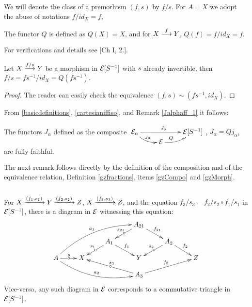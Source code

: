 \begin{definitionst}
We will denote the class of a premorhism  $(f,s)$ by  ${f/s}$. For $A = X$ we adopt the abuse of notations $f/{id_X} = f$, 

\vspace{1ex}

The functor $Q$ is defined as $Q(X) = X$, and for $X \overset {f} {\longrightarrow} Y$,  
$Q(f) = f/{id_X} = f$.  

\vspace{1ex}

For verifications and details see \cite{gabzis}[Ch I, 2.].

\end{definitionst}

\begin{remark} \label{Jalphaff_1}
Let  $X \overset {f/s} {\longrightarrow} Y$ be a morphism in $\mathcal{E}[S^{-1}]$ with $s$ already invertible, then 
$f/s = fs^{-1}/id_X = Q(fs^{-1})$.
\end{remark}\begin{proof}
The reader can easily check the equivalence $(f,s) \sim (fs^{-1}, id_X)$.
\end{proof}
%
From \ref{basicdefinitions}, \ref{cartesianiffiso}, and Remark 
\ref{Jalphaff_1} it follows:
\begin{remark} \label{Jalphafandf}
The functors $J_\alpha$  defined as the composite
$
\xymatrix@R=0ex
     {
      \cc{E}_\alpha  \ar@/_0.5pc/[dr]^{j_\alpha} 
                     \ar[rr]^{J_\alpha} 
   && \cc{E}[S^{-1}]
  \\ 
    & \cc{E} \ar@/_0.5pc/[ur]^<(0.21)Q %
     }		
$, \mbox{$J_\alpha = Qj_\alpha$}, are fully-faithful. \cqd
\end{remark}
The next remark follows directly by the definition of the composition and of the equivalence relation, Definition 
\ref{gzfractions}, items \ref{gzCompo} and \ref{gzMorph}. 
\begin{remark} \label{lift_triangles} ${ }$

For $X \xrightarrow{(f_1,s_1)} Y \xrightarrow{(f_2,s_2)} Z$, 
$X \xrightarrow{(f_3,s_3)} Z$, 
and the equation $f_3/s_3 = f_2/s_2 \circ f_1/s_1$ in $\mathcal{E}[S^{-1}]$,
there is a diagram in $\mathcal{E}$  witnessing this equation:
$$
\xymatrix@R=2.5ex
     {
  &&& A_{21} \ar[ld]_{s_{21}} | \car
        \ar[rd]^{f_{21}}
   \\ 
   && A_1 \ar[ld]_{s_1} | \car
        \ar[rd]^{f_1}
   && A_2 \ar[ld]_{s_2} | \car
        \ar[rd]^{f_2}
    \\
      A \ar@/^1.2pc/[rrruu]^{a_1}  %
        \ar@/_1.2pc/[rrrd]^{a_2}   %
        \ar[r]^{s} | \car
    & X
   && Y
   && Z
     \\
  &&& A_3 \ar[llu]_{s_3} | \car
        \ar[rru]^{f_3} 
     }
$$
Vice-versa, any such diagram in $\mathcal{E}$ corresponds to a commutative triangle in $\mathcal{E}[S^{-1}]$.
\cqd
\end{remark}



